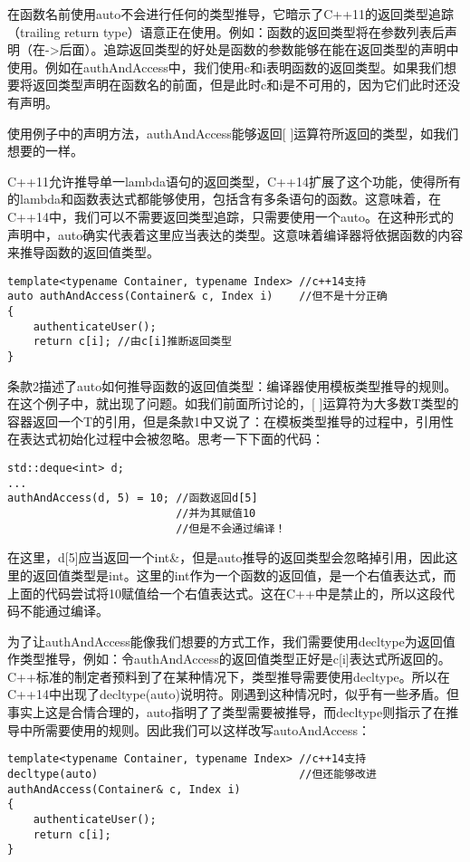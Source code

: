 在函数名前使用auto不会进行任何的类型推导，它暗示了C++11的返回类型追踪（trailing return type）语意正在使用。例如：函数的返回类型将在参数列表后声明（在->后面）。追踪返回类型的好处是函数的参数能够在能在返回类型的声明中使用。例如在authAndAccess中，我们使用c和i表明函数的返回类型。如果我们想要将返回类型声明在函数名的前面，但是此时c和i是不可用的，因为它们此时还没有声明。

使用例子中的声明方法，authAndAccess能够返回[ ]运算符所返回的类型，如我们想要的一样。

C++11允许推导单一lambda语句的返回类型，C++14扩展了这个功能，使得所有的lambda和函数表达式都能够使用，包括含有多条语句的函数。这意味着，在C++14中，我们可以不需要返回类型追踪，只需要使用一个auto。在这种形式的声明中，auto确实代表着这里应当表达的类型。这意味着编译器将依据函数的内容来推导函数的返回值类型。

\begin{lstlisting}
template<typename Container, typename Index> //c++14支持
auto authAndAccess(Container& c, Index i)    //但不是十分正确
{ 
	authenticateUser(); 
	return c[i]; //由c[i]推断返回类型
}
\end{lstlisting}

条款2描述了auto如何推导函数的返回值类型：编译器使用模板类型推导的规则。在这个例子中，就出现了问题。如我们前面所讨论的，[ ]运算符为大多数T类型的容器返回一个T的引用，但是条款1中又说了：在模板类型推导的过程中，引用性在表达式初始化过程中会被忽略。思考一下下面的代码：

\begin{lstlisting}
std::deque<int> d;
...
authAndAccess(d, 5) = 10; //函数返回d[5]
                          //并为其赋值10
                          //但是不会通过编译！
\end{lstlisting}
在这里，d[5]应当返回一个int\&，但是auto推导的返回类型会忽略掉引用，因此这里的返回值类型是int。这里的int作为一个函数的返回值，是一个右值表达式，而上面的代码尝试将10赋值给一个右值表达式。这在C++中是禁止的，所以这段代码不能通过编译。

为了让authAndAccess能像我们想要的方式工作，我们需要使用decltype为返回值作类型推导，例如：令authAndAccess的返回值类型正好是c[i]表达式所返回的。C++标准的制定者预料到了在某种情况下，类型推导需要使用decltype。所以在C++14中出现了decltype(auto)说明符。刚遇到这种情况时，似乎有一些矛盾。但事实上这是合情合理的，auto指明了了类型需要被推导，而decltype则指示了在推导中所需要使用的规则。因此我们可以这样改写autoAndAccess：

\begin{lstlisting}
template<typename Container, typename Index> //c++14支持
decltype(auto)                               //但还能够改进
authAndAccess(Container& c, Index i)    
{ 
	authenticateUser(); 
	return c[i];
}
\end{lstlisting}

